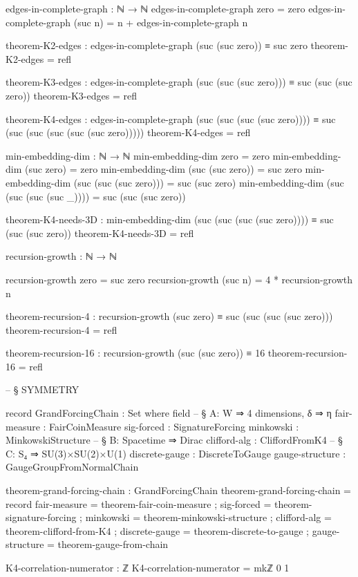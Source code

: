 \documentclass[11pt,a4paper]{book}
\begin{document}
\begin{code}
edges-in-complete-graph : ℕ → ℕ
edges-in-complete-graph zero = zero
edges-in-complete-graph (suc n) = n + edges-in-complete-graph n

theorem-K2-edges : edges-in-complete-graph (suc (suc zero)) ≡ suc zero
theorem-K2-edges = refl

theorem-K3-edges : edges-in-complete-graph (suc (suc (suc zero))) ≡ suc (suc (suc zero))
theorem-K3-edges = refl

theorem-K4-edges : edges-in-complete-graph (suc (suc (suc (suc zero)))) ≡ 
                   suc (suc (suc (suc (suc (suc zero)))))
theorem-K4-edges = refl

min-embedding-dim : ℕ → ℕ
min-embedding-dim zero = zero
min-embedding-dim (suc zero) = zero
min-embedding-dim (suc (suc zero)) = suc zero
min-embedding-dim (suc (suc (suc zero))) = suc (suc zero)
min-embedding-dim (suc (suc (suc (suc _)))) = suc (suc (suc zero))

theorem-K4-needs-3D : min-embedding-dim (suc (suc (suc (suc zero)))) ≡ suc (suc (suc zero))
theorem-K4-needs-3D = refl

recursion-growth : ℕ → ℕ

recursion-growth zero = suc zero
recursion-growth (suc n) = 4 * recursion-growth n

theorem-recursion-4 : recursion-growth (suc zero) ≡ suc (suc (suc (suc zero)))
theorem-recursion-4 = refl

theorem-recursion-16 : recursion-growth (suc (suc zero)) ≡ 16
theorem-recursion-16 = refl


-- § SYMMETRY

record GrandForcingChain : Set where
  field
    -- § A: W ⇒ 4 dimensions, δ ⇒ η
    fair-measure    : FairCoinMeasure
    sig-forced      : SignatureForcing
    minkowski       : MinkowskiStructure
    -- § B: Spacetime ⇒ Dirac
    clifford-alg    : CliffordFromK4
    -- § C: S₄ ⇒ SU(3)×SU(2)×U(1)
    discrete-gauge  : DiscreteToGauge
    gauge-structure : GaugeGroupFromNormalChain

theorem-grand-forcing-chain : GrandForcingChain
theorem-grand-forcing-chain = record
  { fair-measure    = theorem-fair-coin-measure
  ; sig-forced      = theorem-signature-forcing
  ; minkowski       = theorem-minkowski-structure
  ; clifford-alg    = theorem-clifford-from-K4
  ; discrete-gauge  = theorem-discrete-to-gauge
  ; gauge-structure = theorem-gauge-from-chain
  }

K4-correlation-numerator : ℤ
K4-correlation-numerator = mkℤ 0 1



\end{code}
\end{document}
